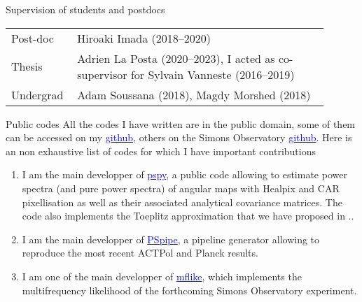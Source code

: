 \documentclass{resume} %
\newcommand{\TIB}[1]{\textcolor{blue}{#1}}
\begin{document}
\begin{rSection}{Supervision of	students and postdocs}
\vspace{-0.4cm}

\begin{table}[h]
{\def\arraystretch{1.5}\tabcolsep=0pt
\begin{tabular}{p{0.15\linewidth}p{0.75\linewidth}}
Post-doc  & Hiroaki Imada (2018--2020) \\
Thesis  & Adrien La Posta (2020--2023), I acted as co-supervisor for Sylvain Vanneste (2016--2019) \\
Undergrad   & Adam Soussana (2018), Magdy Morshed (2018) 
\end{tabular}%
}
\end{table}
\vspace{-0.6cm}
\end{rSection}


\begin{rSection}{Public codes}
All the codes I have written are in the public domain, some of them can be accessed on my \href{https://github.com/thibautlouis}{\TIB{github}}, others on the Simons Observatory \href{https://github.com/simonobs}{\TIB{github}}. Here is an non exhaustive list of codes for which I have important contributions 
\begin{enumerate}
\item I am the main developper of \href{https://github.com/simonsobs/pspy}{\TIB{pspy}}, a public code allowing to estimate power spectra (and pure power spectra) of angular maps with Healpix and CAR pixellisation as well as their associated analytical covariance matrices. The code also implements the Toeplitz approximation that we have proposed in ..
\item I am  the main developper of \href{https://github.com/simonsobs/PSpipe}{\TIB{PSpipe}}, a pipeline generator allowing to reproduce the most recent ACTPol and Planck results. 
\item I am one of the main developper of \href{https://github.com/simonsobs/mflike}{\TIB{mflike}}, which implements the multifrequency likelihood of the forthcoming Simons Observatory experiment. 

\end{enumerate}

\end{rSection}
\end{document}
